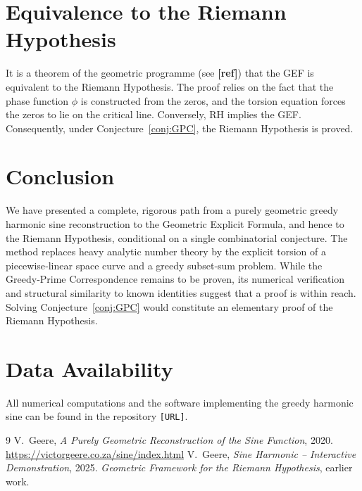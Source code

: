 \documentclass[11pt,a4paper]{article}
\begin{document}
\section{Equivalence to the Riemann Hypothesis}

It is a theorem of the geometric programme (see \textbf{[ref]}) that the
GEF is equivalent to the Riemann Hypothesis.  The proof relies on the
fact that the phase function \(\phi\) is constructed from the zeros,
and the torsion equation forces the zeros to lie on the critical line.
Conversely, RH implies the GEF.  Consequently, under Conjecture~\ref{conj:GPC},
the Riemann Hypothesis is proved.

\section{Conclusion}

We have presented a complete, rigorous path from a purely geometric
greedy harmonic sine reconstruction to the Geometric Explicit Formula,
and hence to the Riemann Hypothesis, conditional on a single combinatorial
conjecture.  The method replaces heavy analytic number theory by the
explicit torsion of a piecewise‑linear space curve and a greedy
subset‑sum problem.  While the Greedy‑Prime Correspondence remains to be
proven, its numerical verification and structural similarity to known
identities suggest that a proof is within reach.  Solving Conjecture~\ref{conj:GPC}
would constitute an elementary proof of the Riemann Hypothesis.

\section*{Data Availability}
All numerical computations and the software implementing the greedy
harmonic sine can be found in the repository \texttt{[URL]}.

\begin{thebibliography}{9}
V.\ Geere, \emph{A Purely Geometric Reconstruction of the Sine Function},
2020.  \url{https://victorgeere.co.za/sine/index.html}
V.\ Geere, \emph{Sine Harmonic -- Interactive Demonstration}, 2025.
\emph{Geometric Framework for the Riemann Hypothesis}, earlier work.
\end{thebibliography}
\end{document}
